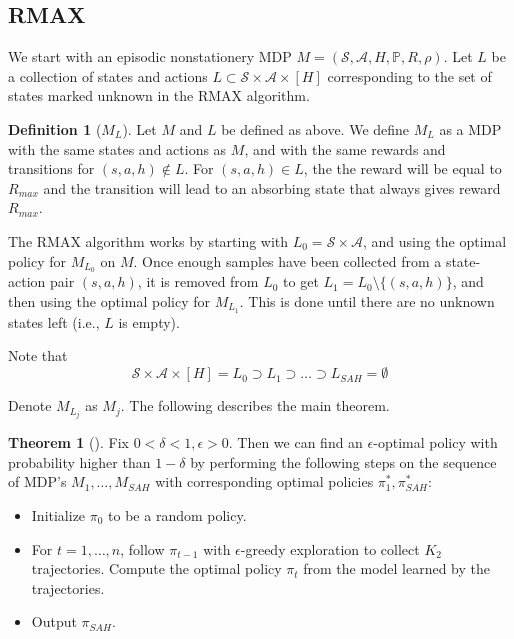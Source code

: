 \documentclass[12pt, letterpaper]{article}
\theoremstyle{definition}
\newtheorem*{defn}{Definition}
\newtheorem*{thm}{Theorem}
\theoremstyle{remark}
\begin{document}
\subsection{RMAX}

We start with an episodic nonstationery MDP \(M = (\mathcal{S}, \mathcal{A}, H, \mathbb{P}, R, \rho)\). Let \(L\) be a collection of states and actions \(L \subset \mathcal{S} \times \mathcal{A} \times [H]\) corresponding to the set of states marked unknown in the RMAX algorithm.

\begin{defn}[\(M_L\)]
    Let \(M\) and \(L\) be defined as above. We define \(M_L\) as a MDP with the same states and actions as \(M\), and with the same rewards and transitions for \((s, a, h) \notin L\). For \((s, a, h) \in L\), the the reward will be equal to \(R_{max}\) and the transition will lead to an absorbing state that always gives reward \(R_{max}\).
\end{defn}

The RMAX algorithm works by starting with \(L_0 = \mathcal{S} \times \mathcal{A}\), and using the optimal policy for \(M_{L_0}\) on \(M\). Once enough samples have been collected from a state-action pair \((s, a, h)\), it is removed from \(L_0\) to get \(L_1 = L_0 \setminus \{(s, a, h)\}\), and then using the optimal policy for \(M_{L_1}\). This is done until there are no unknown states left (i.e., \(L\) is empty).

Note that
\[\mathcal{S} \times \mathcal{A} \times [H] = L_0 \supset L_1 \supset \ldots \supset L_{SAH} = \emptyset\]

Denote \(M_{L_j}\) as \(M_j\). The following describes the main theorem.

\begin{thm}[]
    Fix \(0 < \delta < 1, \epsilon > 0\). Then we can find an \(\epsilon\)-optimal policy with probability higher than \(1 - \delta\) by performing the following steps on the sequence of MDP's \(M_1, \ldots, M_{SAH}\) with corresponding optimal policies \(\pi^*_{1}, \pi^{*}_{SAH}\):

    \begin{itemize}
        \item Initialize \(\pi_0\) to be a random policy.
        \item For \(t = 1, \ldots, n\), follow \(\pi_{t-1}\) with \(\epsilon\)-greedy exploration to collect \(K_2\) trajectories. Compute the optimal policy \(\pi_t\) from the model learned by the trajectories.
        \item Output \(\pi_{SAH}\).
    \end{itemize}
    
\end{thm}
\end{document}
